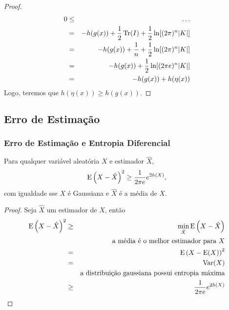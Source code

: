 \begin{frame}[allowframebreaks]
\begin{proof}
	\proofbreak
        \begin{eqnarray}
        0       &\leq& \ldots \nonumber \\
		&=& - h(g(x)) + \frac{1}{2} \operatorname{Tr}( I ) + \frac{1}{2} \ln [(2 \pi)^n \vert K \vert] \\
		&=& - h(g(x)) + \frac{1}{n} + \frac{1}{2} \ln [(2 \pi)^n \vert K \vert] \\
		&=& - h(g(x)) +  \frac{1}{2} \ln [(2 \pi e)^n \vert K \vert] \\
		&=& - h(g(x)) + h(\eta(x))
	\end{eqnarray}
  Logo, teremos que $h(\eta(x)) \geq h(g(x))$.
    
  \end{proof}
\end{frame}



\subsection{Erro de Estimação}
\begin{frame}[allowframebreaks]
  \frametitle{Erro de Estimação e Entropia Diferencial}

  \begin{theorem}
  Para qualquer variável aleatória $X$ e estimador $\hat{X}$,
	\begin{equation}
	\mathrm{E} \left( X - \hat{X} \right)^2 \geq \frac{1}{2 \pi e} e^{2 h(X)} ,
	\end{equation}
  com igualdade sse $X$ é Gaussiana e $\hat{X}$ é a média de $X$.
  \end{theorem}


  \framebreak
  \begin{proof}
    Seja $\hat{X}$ um estimador de $X$, então
    \begin{eqnarray}
    \mathrm{E} \left( X - \hat{X} \right)^2 &\geq& \min_{\hat{X}} \mathrm{E} \left( X - \hat{X} \right) \\
		&& \text{a média é o melhor estimador para } X \nonumber \\
	&=& \mathrm{E} \left( X - \mathrm{E} (X) \right)^2 \\
	&=& \mathrm{Var} (X) \\
		&& \text{a distribuição gaussiana possui entropia máxima} \nonumber \\
	&\geq& \frac{1}{2\pi e} e^{2h(X)} 
    \end{eqnarray}
  \end{proof}

\end{frame}


